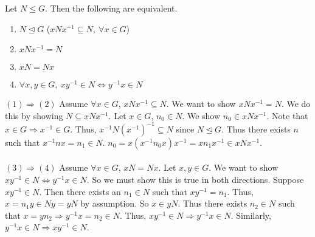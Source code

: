 \documentclass[11pt,letterpaper]{book}
\newcommand{\pn}[1]{\left( #1 \right)}
\theoremstyle{definition}
\begin{document}
\begin{bthm}
    Let $N\le G$. Then the following are equivalent.
    \begin{enumerate}
        \item $N\unlhd G$ ($xNx^{-1}\subseteq N,\ \forall x\in G$)
        \item $xNx^{-1}=N$
        \item $xN=Nx$
        \item $\forall x,y\in G,\ xy^{-1}\in N\Leftrightarrow y^{-1}x\in N$
    \end{enumerate}
\end{bthm}

\begin{bpf}
    $(1)\Rightarrow(2)$ Assume $\forall x\in G$, $xNx^{-1}\subseteq N$. We want to show $xNx^{-1}=N$. We do this by showing $N\subseteq xNx^{-1}$. Let $x\in G$, $n_0\in N$. We show $n_0\in xNx^{-1}$. Note that $x\in G\Rightarrow x^{-1}\in G$. Thus, $x^{-1}N\pn{x^{-1}}^{-1}\subseteq N$ since $N\unlhd G$. Thus there exists $n$ such that $x^{-1}nx=n_1\in N$. $n_0=x\pn{x^{-1}n_0x}x^{-1}=xn_1x^{-1}\in xNx^{-1}$.\\\\
    $(3)\Rightarrow(4)$ Assume $\forall x\in G$, $xN=Nx$. Let $x,y\in G$. We want to show $xy^{-1}\in N\Leftrightarrow y^{-1}x\in N$. So we must show this is true in both directions. Suppose $xy^{-1}\in N$. Then there exists an $n_1\in N$ such that $xy^{-1}=n_1$. Thus, $x=n_1y\in Ny=yN$ by assumption. So $x\in yN$. Thus there exists $n_2\in N$ such that $x=yn_2\Rightarrow y^{-1}x=n_2\in N$. Thus, $xy^{-1}\in N\Rightarrow y^{-1}x\in N$. Similarly, $y^{-1}x\in N\Rightarrow xy^{-1}\in N$.
\end{bpf}
\end{document}
